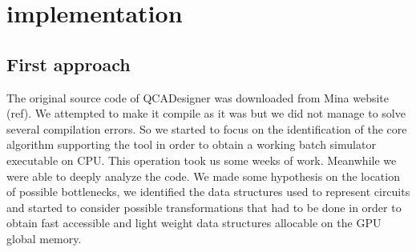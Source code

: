 \chapter{implementation}\label{sec:implementation}
\section{First approach}
The original source code of QCADesigner was downloaded from Mina website (ref). We attempted to make it compile as it was but we did not manage to solve several compilation errors. So we started to focus on the identification of the core algorithm supporting the tool in order to obtain a working batch simulator executable on CPU. This operation took us some weeks of work. Meanwhile we were able to deeply analyze the code. We made some hypothesis on the location of possible bottlenecks, we identified the data structures used to represent circuits and started to consider possible transformations that had to be done in order to obtain fast accessible and light weight data structures allocable on the GPU global memory.